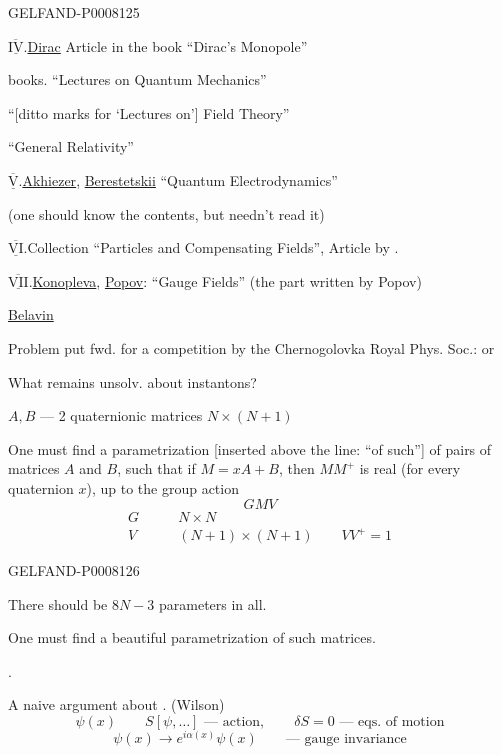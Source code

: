 \begin{GelfandAdjacentEvidence}{GELFAND-P000812}{5}


\(\overline{\underline{\mathrm{IV}}}\).\quad \uline{Dirac} Article in the book “Dirac’s Monopole”

\hspace{1em}books. “Lectures on Quantum Mechanics”

\hspace{1em}“[ditto marks for ‘Lectures on’] Field Theory”

\hspace{1em}“General Relativity”

\(\overline{\underline{\mathrm{V}}}\).\quad \uline{Akhiezer}, \uline{Berestetskii} “Quantum Electrodynamics”

\hspace{1em}(one should know the contents, but needn’t read it)

\(\overline{\underline{\mathrm{VI}}}\).\quad Collection “Particles and Compensating Fields”, Article by .

\(\overline{\underline{\mathrm{VII}}}\).\quad \uline{Konopleva}, \uline{Popov}: “Gauge Fields” (the part written by Popov)

\uline{Belavin}

Problem put fwd. for a competition by the Chernogolovka Royal Phys. Soc.: or

What remains unsolv. about instantons?

\(A,B\) — 2 quaternionic matrices \(N\times(N+1)\)

One must find a parametrization [inserted above the line: “of such”] of pairs of matrices \(A\) and \(B\), such that
if \(M=xA+B\), then \(MM^+\) is real (for every quaternion \(x\)),
up to the group action
\[
GMV
\]
\[
\begin{aligned}
G&\qquad N\times N\\
V&\qquad (N+1)\times(N+1)\qquad VV^+=1
\end{aligned}
\]
\end{GelfandAdjacentEvidence}
\begin{GelfandAdjacentEvidence}{GELFAND-P000812}{6}


There should be \(8N-3\) parameters in all.

One must find a beautiful parametrization of such matrices.

.

A naive argument about . (Wilson)
\[
\psi(x)\qquad S[\psi,\ldots]\text{ — action},
\qquad \delta S=0\text{ — eqs. of motion}
\]
\[
\psi(x)\longrightarrow e^{i\alpha(x)}\psi(x)
\qquad\text{— gauge invariance}
\]
\end{GelfandAdjacentEvidence}



